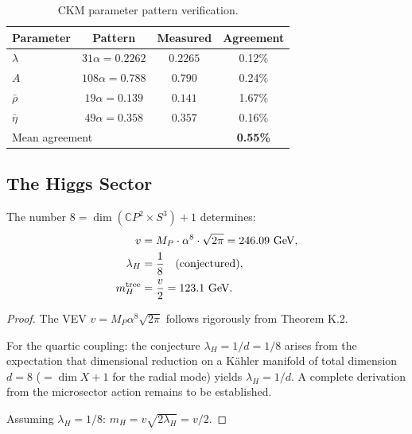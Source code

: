 \begin{table}[h]
\centering
\caption{CKM parameter pattern verification.}\label{tab:ckm-verify}
\renewcommand{\arraystretch}{1.3}
\begin{tabular}{lccc}
\toprule
Parameter & Pattern & Measured & Agreement \\
\midrule
$\lambda$ & $31\alpha = 0.2262$ & $0.2265$ & 0.12\% \\
$A$ & $108\alpha = 0.788$ & $0.790$ & 0.24\% \\
$\bar{\rho}$ & $19\alpha = 0.139$ & $0.141$ & 1.67\% \\
$\bar{\eta}$ & $49\alpha = 0.358$ & $0.357$ & 0.16\% \\
\midrule
\multicolumn{3}{l}{Mean agreement} & \textbf{0.55\%} \\
\bottomrule
\end{tabular}
\end{table}

\subsection{The Higgs Sector}\label{app:higgs-sector}

\begin{theorem}\label{thm:higgs-z}
The number $8 = \dim(\mathbb{C}P^2 \times S^3) + 1$ determines:
\begin{align}
v &= M_P \cdot \alpha^8 \cdot \sqrt{2\pi} = 246.09~\text{GeV}, \\
\lambda_H &= \frac{1}{8} \quad \text{(conjectured)}, \\
m_H^{\rm tree} &= \frac{v}{2} = 123.1~\text{GeV}.
\end{align}
\end{theorem}

\begin{proof}
The VEV $v = M_P \alpha^8 \sqrt{2\pi}$ follows rigorously from Theorem K.2.

For the quartic coupling: the conjecture $\lambda_H = 1/d = 1/8$ arises from the 
expectation that dimensional reduction on a K\"ahler manifold of total dimension 
$d = 8$ ($= \dim X + 1$ for the radial mode) yields $\lambda_H = 1/d$. A complete 
derivation from the microsector action remains to be established.

Assuming $\lambda_H = 1/8$: $m_H = v\sqrt{2\lambda_H} = v/2$.
\end{proof}

